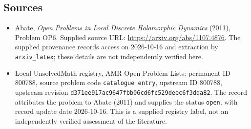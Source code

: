 \documentclass[11pt]{article}
\begin{document}
\subsection{Sources}
\begin{itemize}
\item Abate, \emph{Open Problems in Local Discrete Holomorphic Dynamics} (2011), Problem OP6. Supplied source URL: \url{https://arxiv.org/abs/1107.4876}. The supplied provenance records access on 2026-10-16 and extraction by \texttt{arxiv\_latex}; these details are not independently verified here.
\item Local UnsolvedMath registry, AMR Open Problem Lists: permanent ID \(800788\), source problem code \texttt{catalogue entry}, upstream ID \(800788\), upstream revision \texttt{d371ee917ac9647fbb06cd6fc529deec6f3dda82}. The record attributes the problem to Abate (2011) and supplies the status \texttt{open}, with record update date 2026-10-16. This is a supplied registry label, not an independently verified assessment of the literature.
\end{itemize}
\end{document}
